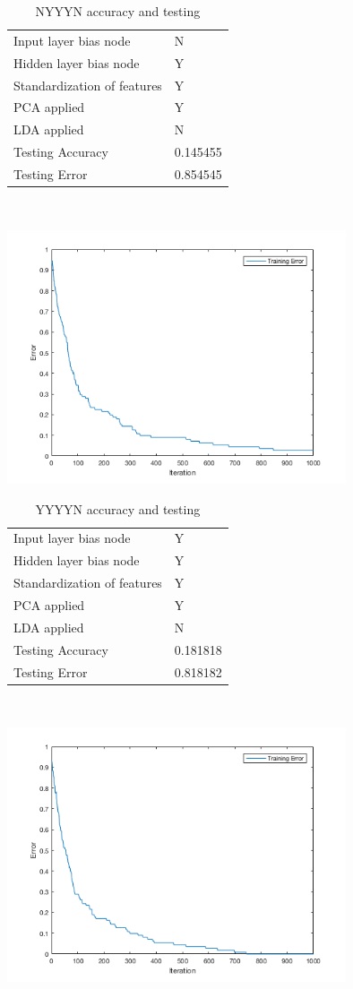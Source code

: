 \documentclass[12pt]{article}
\newcommand{\accuracyAndTestErrorTable}[8]{
  \begin{tabular}{l|l}
    \hline
    Input layer bias node & #1 \\
    Hidden layer bias node & #2 \\
    Standardization of features & #3 \\
    PCA applied & #4 \\
    LDA applied & #5 \\
    \hline
    Testing Accuracy & #6 \\
    Testing Error & #7 \\
    \hline
  \end{tabular}
  ~\\[60pt]
  \caption{#8}
}
\begin{document}


\begin{center}
  \begin{table}[H]
    \begin{varwidth}[b]{0.4\linewidth}
      \centering
      \accuracyAndTestErrorTable{N}{Y}{Y}{Y}{N}{0.145455}{0.854545}{NYYYN accuracy and testing}
      \label{table:NYYYN}
    \end{varwidth}%
    \hfill
    \begin{minipage}[b]{0.6\linewidth}
      \centering
      \includegraphics[width=100mm]{NYYYN_training_error.png}
      \label{fig:NYYYN}
    \end{minipage}
  \end{table}
\end{center}




\begin{center}
  \begin{table}[H]
    \begin{varwidth}[b]{0.4\linewidth}
      \centering
      \accuracyAndTestErrorTable{Y}{Y}{Y}{Y}{N}{0.181818}{0.818182}{YYYYN accuracy and testing}
      \label{table:YYYYN}
    \end{varwidth}%
    \hfill
    \begin{minipage}[b]{0.6\linewidth}
      \centering
      \includegraphics[width=100mm]{YYYYN_training_error.png}
      \label{fig:YYYYN}
    \end{minipage}
  \end{table}
\end{center}
\end{document}
